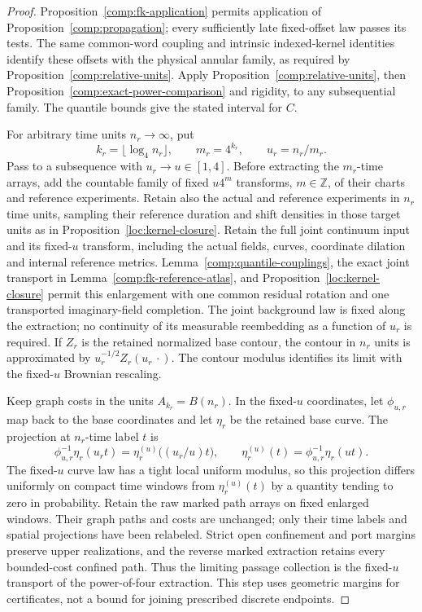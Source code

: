 \begin{proof}
Proposition~\ref{comp:fk-application} permits application of
Proposition~\ref{comp:propagation}; every sufficiently late
fixed-offset law passes its tests.
The same common-word coupling and intrinsic indexed-kernel identities
identify these offsets with the physical annular family, as required
by Proposition~\ref{comp:relative-units}.
Apply Proposition~\ref{comp:relative-units}, then
Proposition~\ref{comp:exact-power-comparison} and rigidity, to any
subsequential family.  The quantile bounds give the stated interval
for $C$.

For arbitrary time units $n_r\to\infty$, put
\[
 k_r=\lfloor\log_4 n_r\rfloor,\qquad m_r=4^{k_r},\qquad
 u_r=n_r/m_r.
\]
Pass to a subsequence with $u_r\to u\in[1,4]$.
Before extracting the $m_r$-time arrays, add the countable family of
fixed $u4^m$ transforms, $m\in\mathbb Z$, of their charts and reference
experiments.  Retain also the actual and reference experiments in
$n_r$ time units, sampling their reference duration and shift densities
in those target units as in Proposition~\ref{loc:kernel-closure}.
Retain the full joint continuum input and its fixed-$u$
transform, including the actual fields, curves, coordinate dilation and
internal reference metrics.  Lemma~\ref{comp:quantile-couplings}, the
exact joint transport in Lemma~\ref{comp:fk-reference-atlas}, and
Proposition~\ref{loc:kernel-closure} permit this enlargement with one
common residual rotation and one transported imaginary-field completion.
The joint background law is fixed along the extraction; no continuity
of its measurable reembedding as a function of $u_r$ is required.
If $Z_r$ is the retained normalized base contour, the contour in $n_r$
units is approximated by $u_r^{-1/2}Z_r(u_r\,\cdot)$.  The contour
modulus identifies its limit with the fixed-$u$ Brownian rescaling.

Keep graph costs in the units $A_{k_r}=B(n_r)$.  In the fixed-$u$
coordinates, let $\phi_{u,r}$ map back to the base coordinates and let
$\eta_r$ be the retained base curve.  The projection at $n_r$-time label
$t$ is
\[
 \phi_{u,r}^{-1}\eta_r(u_rt)
       =\eta_r^{(u)}\bigl((u_r/u)t\bigr),\qquad
 \eta_r^{(u)}(t)=\phi_{u,r}^{-1}\eta_r(ut).
\]
The fixed-$u$ curve law has a tight local uniform modulus, so this
projection differs uniformly on compact time windows from
$\eta_r^{(u)}(t)$ by a quantity tending to zero in probability.
Retain the raw marked path arrays on fixed enlarged windows.  Their
graph paths and costs are unchanged; only their time labels and spatial
projections have been relabeled.  Strict open confinement and port
margins preserve upper realizations, and the reverse marked extraction
retains every bounded-cost confined path.  Thus the limiting passage
collection is the fixed-$u$ transport of the power-of-four extraction.
This step uses geometric margins for certificates, not a bound for
joining prescribed discrete endpoints.


\end{proof}
